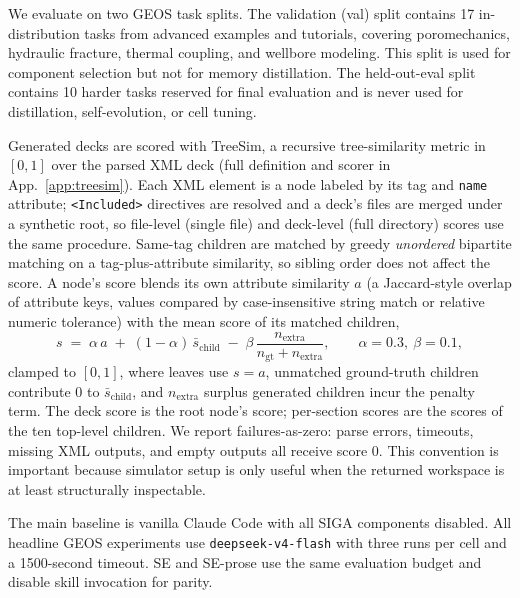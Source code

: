 \documentclass{article}
\begin{document}
We evaluate on two GEOS task splits. The validation (val) split contains 17 in-distribution tasks from advanced examples 
and tutorials, covering poromechanics, hydraulic fracture, thermal coupling, and wellbore modeling. This split is used 
for component selection but not for memory distillation. The held-out-eval split contains 10 harder tasks reserved 
for final evaluation and is never used for distillation, self-evolution, or cell tuning.

Generated decks are scored with TreeSim, a recursive tree-similarity metric in $[0,1]$ over the parsed XML deck
(full definition and scorer in App.~\ref{app:treesim}). Each XML element is a node labeled by its tag and \texttt{name}
attribute; \texttt{<Included>} directives are resolved and a deck's files are merged under a synthetic root, so file-level
(single file) and deck-level (full directory) scores use the same procedure. Same-tag children are matched by greedy
\emph{unordered} bipartite matching on a tag-plus-attribute similarity, so sibling order does not affect the score. A
node's score blends its own attribute similarity $a$ (a Jaccard-style overlap of attribute keys, values compared by
case-insensitive string match or relative numeric tolerance) with the mean score of its matched children,
\begin{equation}
s \;=\; \alpha\, a \;+\; (1-\alpha)\,\bar{s}_{\mathrm{child}} \;-\; \beta\,\frac{n_{\mathrm{extra}}}{n_{\mathrm{gt}}+n_{\mathrm{extra}}},
\qquad \alpha=0.3,\ \beta=0.1,
\label{eq:treesim}
\end{equation}
clamped to $[0,1]$, where leaves use $s=a$, unmatched ground-truth children contribute $0$ to $\bar{s}_{\mathrm{child}}$,
and $n_{\mathrm{extra}}$ surplus generated children incur the penalty term. The deck score is the root node's score;
per-section scores are the scores of the ten top-level children. We report failures-as-zero: parse errors, timeouts,
missing XML outputs, and empty outputs all receive score 0. This convention is important because simulator setup is only
useful when the returned workspace is at least structurally inspectable.

The main baseline is vanilla Claude Code with all SIGA components disabled. All headline GEOS experiments use 
\texttt{deepseek-v4-flash} with three runs per cell and a 1500-second timeout. SE and SE-prose use the same evaluation budget 
and disable skill invocation for parity.



\end{document}
